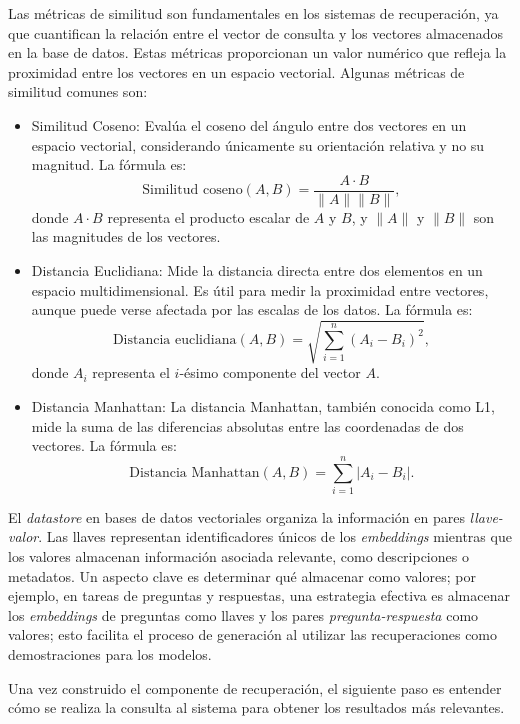 Las métricas de similitud son fundamentales en los sistemas de recuperación, ya que cuantifican la relación entre el vector de consulta y los vectores almacenados en la base de datos. Estas métricas proporcionan un valor numérico que refleja la proximidad entre los vectores en un espacio vectorial. Algunas métricas de similitud comunes son:

\begin{itemize}
    \item Similitud Coseno: Evalúa el coseno del ángulo entre dos vectores en un espacio vectorial, considerando únicamente su orientación relativa y no su magnitud. La fórmula es:
    \[
    \text{Similitud coseno}(A, B) = \frac{A \cdot B}{\|A\| \|B\|},
    \]
    donde \(A \cdot B\) representa el producto escalar de \(A\) y \(B\), y \(\|A\|\) y \(\|B\|\) son las magnitudes de los vectores.
    
    \item Distancia Euclidiana: Mide la distancia directa entre dos elementos en un espacio multidimensional. Es útil para medir la proximidad entre vectores, aunque puede verse afectada por las escalas de los datos. La fórmula es:
    \[
    \text{Distancia euclidiana}(A, B) = \sqrt{\sum_{i=1}^{n} (A_i - B_i)^2},
    \]
    donde \(A_i\) representa el $i$-ésimo componente del vector \(A\).
    
    \item Distancia Manhattan: La distancia Manhattan, también conocida como L1, mide la suma de las diferencias absolutas entre las coordenadas de dos vectores. La fórmula es:
    \[
    \text{Distancia Manhattan}(A, B) = \sum_{i=1}^{n} |A_i - B_i|.
    \]
\end{itemize}

El \textit{datastore} en bases de datos vectoriales organiza la información en pares \textit{llave-valor}. Las llaves representan identificadores únicos de los \textit{embeddings} mientras que los valores almacenan información asociada relevante, como descripciones o metadatos. Un aspecto clave es determinar qué almacenar como valores; por ejemplo, en tareas de preguntas y respuestas, una estrategia efectiva es almacenar los \textit{embeddings} de preguntas como llaves y los pares \textit{pregunta-respuesta} como valores; esto facilita el proceso de generación al utilizar las recuperaciones como demostraciones para los modelos.

Una vez construido el componente de recuperación, el siguiente paso es entender cómo se realiza la consulta al sistema para obtener los resultados más relevantes.

